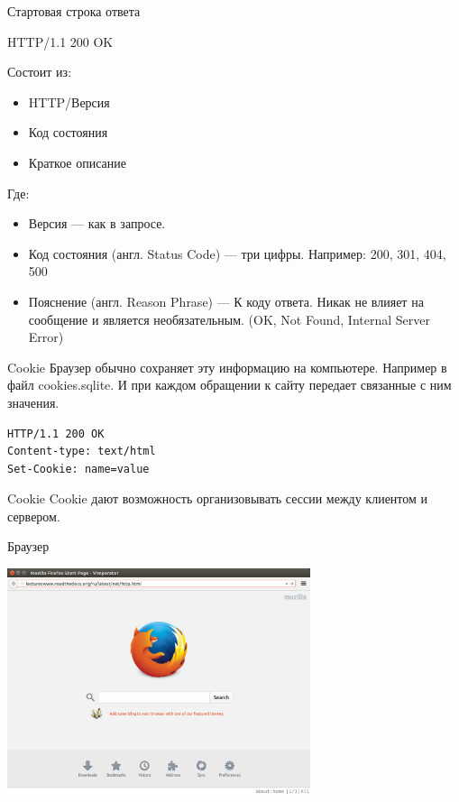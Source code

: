 \documentclass[c,unicode,russian]{beamer}
\begin{document}
\begin{frame}{Стартовая строка ответа}

    HTTP/1.1 200 OK

    Состоит из:
    \begin{itemize}
        \item HTTP/Версия
        \item Код состояния
        \item Краткое описание
    \end{itemize}

    Где:

    \begin{itemize}
        \item Версия — как в запросе.
        \item Код состояния (англ. Status Code) — три цифры.
            \newline Например: 200, 301, 404, 500
        \item Пояснение (англ. Reason Phrase) — К коду ответа. Никак не влияет
            на сообщение и является необязательным. (OK, Not Found, Internal Server Error)
    \end{itemize}

\end{frame}

\begin{frame}[fragile]{Cookie}
    Браузер обычно сохраняет эту информацию на компьютере.\newline
    Например в файл cookies.sqlite. \newline
    И при каждом обращении к сайту передает связанные с ним значения.
    \begin{Verbatim}[fontsize=\small]
HTTP/1.1 200 OK
Content-type: text/html
Set-Cookie: name=value
    \end{Verbatim}
\end{frame}

\begin{frame}{Cookie}
    Cookie дают возможность организовывать сессии между клиентом и сервером.
\end{frame}

\begin{frame}{Браузер}
 \begin{center}
     \includegraphics[width=3.5in]{media/http.example.mozzila.png}
 \end{center}
\end{frame}
\end{document}
